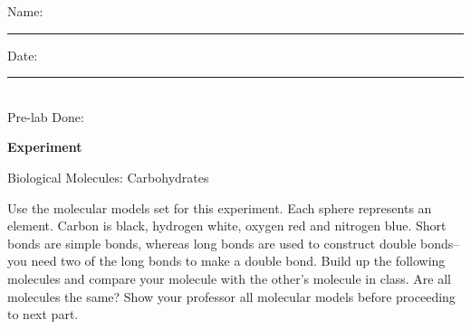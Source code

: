 \documentclass[main.tex]{subfiles}
\begin{document}
\begin{fullwidth}
\begin{multicols}{2}
\begin{tcolorbox}[enhanced jigsaw,breakable,size=title,
colback=mybrown!05,colframe=black,fonttitle=\bfseries,
title=STUDENT INFO,pad at break=1mm, break at=15cm/0pt ]
\vspace{0.2cm}
\noindent Name: \rule{5cm}{0.4pt}Date:\rule{1cm}{0.4pt}\\
Pre-lab Done: \quad
\end{tcolorbox}
\end{multicols}
\hfill
\vspace{0.2cm}
\begin{center}
{\large \bfseries 
Experiment
\par
\Huge
Biological Molecules: Carbohydrates
\\[5pt] \par}
\vspace{0.2cm}
\end{center}
\par
\noindent
\uline{  \hfill \normalsize \hfill       }

\vspace{0.2cm}{\large \bfseries Stereoisomers: d and l }
Use the molecular models set for this experiment. Each sphere represents an element. Carbon is black, hydrogen white, oxygen red and nitrogen blue. Short bonds are simple bonds, whereas long bonds are used to construct double bonds--you need two of the long bonds to make a double bond. Build up the following molecules and compare your molecule with the other's molecule in class. Are all molecules the same? Show your professor all molecular models before proceeding to next part.
\begin{center}\end{center}



\end{fullwidth}
\end{document}
